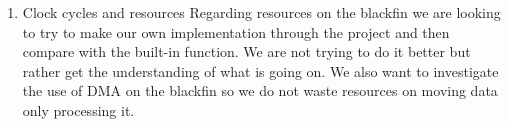 \begin{enumerate}
\item Clock cycles and resources
Regarding resources on the blackfin we are looking to try to make our own implementation through the project and then compare with the built-in function. We are not trying to do it better but rather get the understanding of what is going on.
We also want to investigate the use of DMA on the blackfin so we do not waste resources on moving data only processing it.

\end{enumerate}
